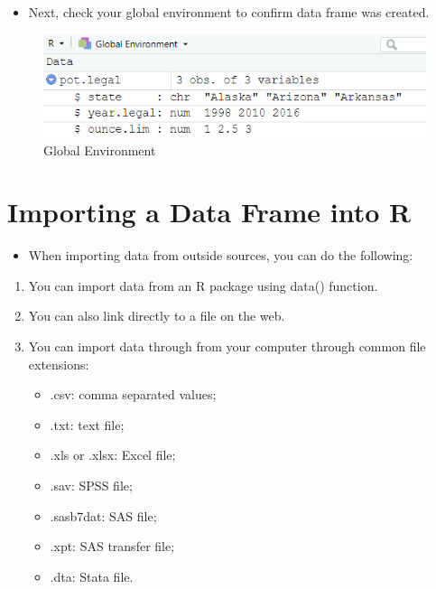\documentclass[
  letterpaper,
  DIV=11,
  numbers=noendperiod]{scrreprt}
\providecommand{\tightlist}{%
  \setlength{\itemsep}{0pt}\setlength{\parskip}{0pt}}\usepackage{longtable,booktabs,array}
\begin{document}
\begin{itemize}
\tightlist
\item
  Next, check your global environment to confirm data frame was created.
\end{itemize}

\begin{figure}[H]

{\centering \includegraphics{Pictures/Ch1/DataFrame.png}

}

\caption{Global Environment}

\end{figure}%

\section{Importing a Data Frame into
R}\label{importing-a-data-frame-into-r}

\begin{itemize}
\tightlist
\item
  When importing data from outside sources, you can do the following:
\end{itemize}

\begin{enumerate}
\def\labelenumi{\arabic{enumi}.}
\tightlist
\item
  You can import data from an R package using data() function.
\item
  You can also link directly to a file on the web.
\item
  You can import data through from your computer through common file
  extensions:

  \begin{itemize}
  \tightlist
  \item
    .csv: comma separated values;
  \item
    .txt: text file;
  \item
    .xls or .xlsx: Excel file;
  \item
    .sav: SPSS file;
  \item
    .sasb7dat: SAS file;
  \item
    .xpt: SAS transfer file;
  \item
    .dta: Stata file.
  \end{itemize}
\end{enumerate}
\end{document}
